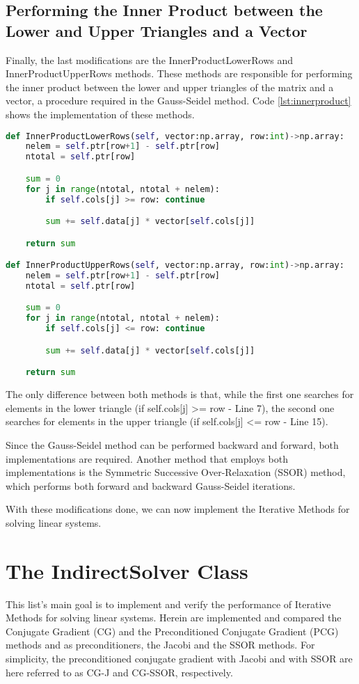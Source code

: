\subsection{Performing the Inner Product between the Lower and Upper Triangles and a Vector} \label{sec:lower}
Finally, the last modifications are the InnerProductLowerRows and InnerProductUpperRows methods. These methods are responsible for performing the inner product between the lower and upper triangles of the matrix and a vector, a procedure required in the Gauss-Seidel method. Code \ref{lst:innerproduct} shows the implementation of these methods.
\begin{lstlisting}[language=python, caption={InnerProductLowerRows and InnerProductUpperRows methods implementation}, label={lst:innerproduct}]
def InnerProductLowerRows(self, vector:np.array, row:int)->np.array:
    nelem = self.ptr[row+1] - self.ptr[row]
    ntotal = self.ptr[row]

    sum = 0
    for j in range(ntotal, ntotal + nelem):
        if self.cols[j] >= row: continue

        sum += self.data[j] * vector[self.cols[j]]

    return sum

def InnerProductUpperRows(self, vector:np.array, row:int)->np.array:
    nelem = self.ptr[row+1] - self.ptr[row]
    ntotal = self.ptr[row]

    sum = 0
    for j in range(ntotal, ntotal + nelem):
        if self.cols[j] <= row: continue

        sum += self.data[j] * vector[self.cols[j]]

    return sum
\end{lstlisting}

The only difference between both methods is that, while the first one searches for elements in the lower triangle (if self.cols[j] >= row - Line 7), the second one searches for elements in the upper triangle (if self.cols[j] <= row - Line 15). 

Since the Gauss-Seidel method can be performed backward and forward, both implementations are required. Another method that employs both implementations is the Symmetric Successive Over-Relaxation (SSOR) method, which performs both forward and backward Gauss-Seidel iterations.

With these modifications done, we can now implement the Iterative Methods for solving linear systems.

\section{The IndirectSolver Class}\label{sec:indirectsolver}
This list's main goal is to implement and verify the performance of Iterative Methods for solving linear systems. Herein are implemented and compared the Conjugate Gradient (CG) and the Preconditioned Conjugate Gradient (PCG) methods and as preconditioners, the Jacobi and the SSOR methods. For simplicity, the preconditioned conjugate gradient with Jacobi and with SSOR are here referred to as CG-J and CG-SSOR, respectively.

